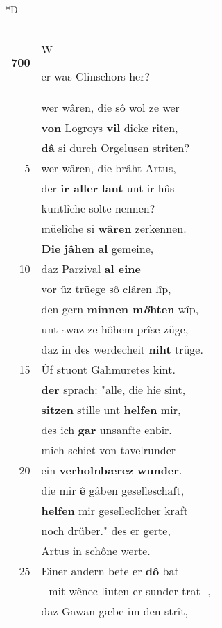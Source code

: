 \documentclass[8pt,a4paper,notitlepage]{article}
\begin{document}
\begin{table}[ht]
\begin{minipage}[t]{0.5\linewidth}
\small
\begin{center}*D
\end{center}
\begin{tabular}{rl}
\textbf{700} & \begin{large}W\end{large}er was Clinschors her?\\ 
 & wer wâren, die sô wol ze wer\\ 
 & \textbf{von} Logroys \textbf{vil} dicke riten,\\ 
 & \textbf{dâ} si durch Orgelusen striten?\\ 
5 & wer wâren, die brâht Artus,\\ 
 & der \textbf{ir aller} \textbf{lant} unt ir hûs\\ 
 & kuntlîche solte nennen?\\ 
 & müelîche si \textbf{wâren} zerkennen.\\ 
 & \textbf{Die} \textbf{jâhen} \textbf{al} gemeine,\\ 
10 & daz Parzival \textbf{al eine}\\ 
 & vor ûz trüege sô clâren lîp,\\ 
 & den gern \textbf{minnen m\textit{ö}hten} wîp,\\ 
 & unt swaz ze hôhem prîse züge,\\ 
 & daz in des werdecheit \textbf{niht} trüge.\\ 
15 & Ûf stuont Gahmuretes kint.\\ 
 & \textbf{der} sprach: "alle, die hie sint,\\ 
 & \textbf{sitzen} stille unt \textbf{helfen} mir,\\ 
 & des ich \textbf{gar} unsanfte enbir.\\ 
 & mich schiet von tavelrunder\\ 
20 & ein \textbf{verholnbærez} \textbf{wunder}.\\ 
 & die mir \textbf{ê} gâben geselleschaft,\\ 
 & \textbf{helfen} mir geselleclîcher kraft\\ 
 & noch drüber." des er gerte,\\ 
 & Artus in schône werte.\\ 
25 & Einer andern bete er \textbf{dô} bat\\ 
 & - mit wênec liuten er sunder trat -,\\ 
 & daz Gawan gæbe im den strît,\\ 

\end{tabular}
\end{minipage}
\end{table}
\end{document}
